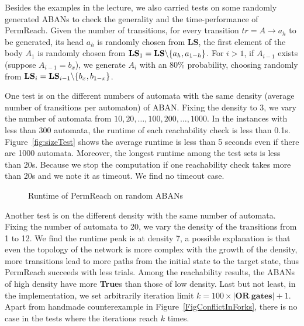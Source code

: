 \documentclass[runningheads]{llncs}
\DeclarePairedDelimiter{\miset}{\setminus\{}{\}}
\begin{document}
Besides the examples in the lecture, we also carried tests on some randomly generated ABANs to check the generality and the time-performance of PermReach. 
Given the number of transitions, for every transition $tr=A\to a_h$ to be generated, its head $a_h$ is randomly chosen from $\mathbf{LS}$, the first element of the body $A_1$ is randomly chosen from $\mathbf{LS}_1=\mathbf{LS}\miset{a_h,a_{1-h}}$.
For $i>1$, if $A_{i-1}$ exists (suppose $A_{i-1}=b_x$), we generate $A_i$ with an 80\% probability, choosing randomly from $\mathbf{LS}_i=\mathbf{LS}_{i-1}\miset{b_x,b_{1-x}}$. 
 
One test is on the different numbers of automata with the same density (average number of transitions per automaton) of ABAN. Fixing the density to 3, we vary the number of automata from $10,20,\ldots,100,200,\ldots,1000$.
In the instances with less than 300 automata, the runtime of each reachability check is less than 0.1s.
Figure~\ref{fig:sizeTest} shows the average runtime is less than 5 seconds even if there are 1000 automata. 
Moreover, the longest runtime among the test sets is less than 20s. 
Because we stop the computation if one reachability check takes more than 20s and we note it as timeout.
We find no timeout case.
\begin{figure}[ht]
    \caption{Runtime of PermReach on random ABANs}
\end{figure}
Another test is on the different density with the same number of automata. 
Fixing the number of automata to 20, we vary the density of the transitions from 1 to 12.
We find the runtime peak is at density 7, a possible explanation is that even the topology of the network is more complex with the growth of the density, more transitions lead to more paths from the initial state to the target state, thus PermReach succeeds with less trials.
Among the reachability results, the ABANs of high density have more \textbf{True}s than those of low density.
Last but not least, in the implementation, we set arbitrarily iteration limit $k=100\times|\mathbf{OR\  gates}|+1$. 
Apart from handmade counterexample in Figure~\ref{FigConflictInForks}, there is no case in the tests where the iterations reach $k$ times.
\end{document}
